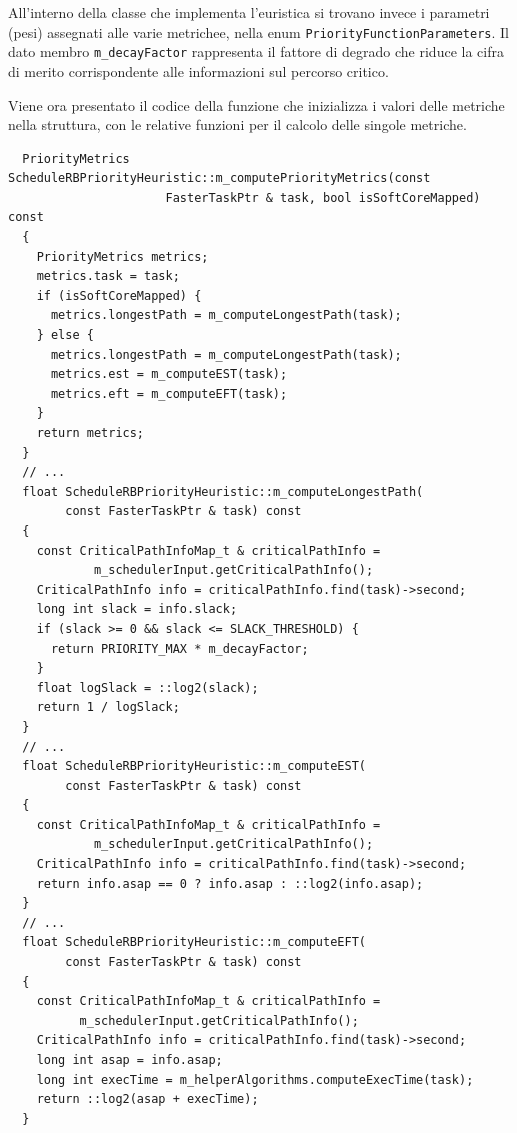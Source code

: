 All'interno della classe che implementa l'euristica si trovano invece i 
parametri (pesi) assegnati alle varie metrichee, nella enum \verb+PriorityFunctionParameters+.
Il dato membro 
\verb+m_decayFactor+ rappresenta il fattore di degrado che riduce la cifra di 
merito corrispondente alle informazioni sul percorso critico.

Viene ora presentato il codice della funzione che inizializza i valori delle 
metriche nella struttura, con le relative funzioni per il calcolo delle singole 
metriche.
\newline
\begin{verbatim}
  PriorityMetrics ScheduleRBPriorityHeuristic::m_computePriorityMetrics(const 
                      FasterTaskPtr & task, bool isSoftCoreMapped) const
  {
    PriorityMetrics metrics;
    metrics.task = task;
    if (isSoftCoreMapped) {
      metrics.longestPath = m_computeLongestPath(task);
    } else {
      metrics.longestPath = m_computeLongestPath(task);
      metrics.est = m_computeEST(task);
      metrics.eft = m_computeEFT(task);
    }
    return metrics;
  }
  // ...
  float ScheduleRBPriorityHeuristic::m_computeLongestPath(
        const FasterTaskPtr & task) const
  {
    const CriticalPathInfoMap_t & criticalPathInfo = 
            m_schedulerInput.getCriticalPathInfo();
    CriticalPathInfo info = criticalPathInfo.find(task)->second;
    long int slack = info.slack;
    if (slack >= 0 && slack <= SLACK_THRESHOLD) {
      return PRIORITY_MAX * m_decayFactor;
    }
    float logSlack = ::log2(slack);
    return 1 / logSlack;
  }
  // ...
  float ScheduleRBPriorityHeuristic::m_computeEST(
        const FasterTaskPtr & task) const
  {
    const CriticalPathInfoMap_t & criticalPathInfo = 
            m_schedulerInput.getCriticalPathInfo();
    CriticalPathInfo info = criticalPathInfo.find(task)->second;
    return info.asap == 0 ? info.asap : ::log2(info.asap);
  }
  // ...
  float ScheduleRBPriorityHeuristic::m_computeEFT(
        const FasterTaskPtr & task) const
  {
    const CriticalPathInfoMap_t & criticalPathInfo = 
          m_schedulerInput.getCriticalPathInfo();
    CriticalPathInfo info = criticalPathInfo.find(task)->second;
    long int asap = info.asap;
    long int execTime = m_helperAlgorithms.computeExecTime(task);
    return ::log2(asap + execTime);
  }
\end{verbatim}


